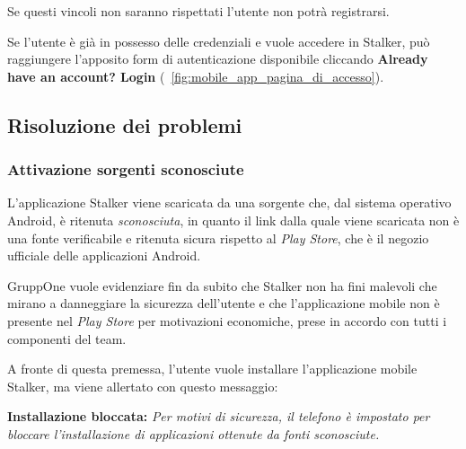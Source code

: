 \documentclass[../manuale-utente.tex]{subfiles}
\begin{document}
Se questi vincoli non saranno rispettati l'utente non potrà registrarsi.

Se l'utente è già in possesso delle credenziali e vuole accedere in Stalker, può raggiungere l'apposito form di autenticazione disponibile cliccando \textbf{Already have an account? Login} (~\ref{fig:mobile_app_pagina_di_accesso}).
\newpage





\subsection{Risoluzione dei problemi}%
\label{subs:mobile_app_risoluzione_problemi}

\subsubsection{Attivazione sorgenti sconosciute}%
\label{subs:mobile_app_attivare_sorgenti_sconosciute}

L'applicazione Stalker viene scaricata da una sorgente che, dal sistema operativo Android, è ritenuta \textit{sconosciuta}, in quanto il link dalla quale viene scaricata non è una fonte verificabile e ritenuta sicura rispetto al \textit{Play Store}, che è il negozio ufficiale delle applicazioni Android.

GruppOne vuole evidenziare fin da subito che Stalker non ha fini malevoli che mirano a danneggiare la sicurezza dell'utente e che l'applicazione mobile non è presente nel \textit{Play Store} per motivazioni economiche, prese in accordo con tutti i componenti del team. \par\bigskip

A fronte di questa premessa, l'utente vuole installare l'applicazione mobile Stalker, ma viene allertato con questo messaggio: \par\bigskip

\textbf{Installazione bloccata:} \textit{Per motivi di sicurezza, il telefono è impostato per bloccare l'installazione di applicazioni ottenute da fonti sconosciute.} \par\bigskip
\end{document}
